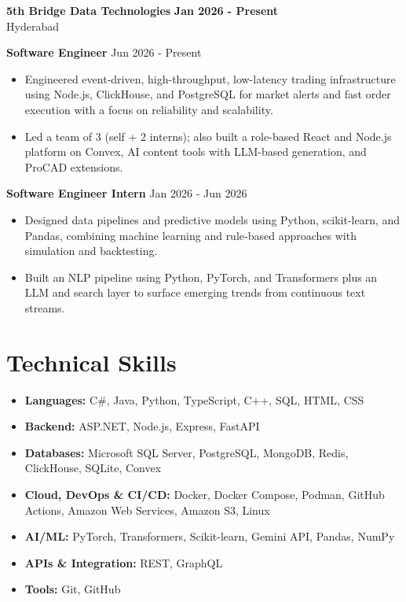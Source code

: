 \documentclass[a4paper,11pt]{article}
\newcommand{\resumeItem}[1]{\item \small{#1}}
\newcommand{\resumeSubheading}[4]{%
  \textbf{#1} \hfill \textbf{#2} \\
{#3} \hfill {#4}
}
\newcommand{\resumeSubHeadingListStart}{\begin{itemize}}
\newcommand{\resumeSubHeadingListEnd}{\end{itemize}}
\begin{document}
\resumeSubheading
{5th Bridge Data Technologies}{Jan 2026 - Present}
{Hyderabad}{}

\textbf{Software Engineer} \hfill {Jun 2026 - Present}
\resumeSubHeadingListStart
\resumeItem{Engineered event-driven, high-throughput, low-latency trading infrastructure using Node.js, ClickHouse, and PostgreSQL for market alerts and fast order execution with a focus on reliability and scalability.}
\resumeItem{Led a team of 3 (self + 2 interns); also built a role-based React and Node.js platform on Convex, AI content tools with LLM-based generation, and ProCAD extensions.}
\resumeSubHeadingListEnd

\textbf{Software Engineer Intern} \hfill {Jan 2026 - Jun 2026}
\resumeSubHeadingListStart
\resumeItem{Designed data pipelines and predictive models using Python, scikit-learn, and Pandas, combining machine learning and rule-based approaches with simulation and backtesting.}
\resumeItem{Built an NLP pipeline using Python, PyTorch, and Transformers plus an LLM and search layer to surface emerging trends from continuous text streams.}
\resumeSubHeadingListEnd


\section*{Technical Skills}
\begin{itemize}
\item \textbf{Languages:} C\#, Java, Python, TypeScript, C++, SQL, HTML, CSS
\item \textbf{Backend:} ASP.NET, Node.js, Express, FastAPI
\item \textbf{Databases:} Microsoft SQL Server, PostgreSQL, MongoDB, Redis, ClickHouse, SQLite, Convex
\item \textbf{Cloud, DevOps \& CI/CD:} Docker, Docker Compose, Podman, GitHub Actions, Amazon Web Services, Amazon S3, Linux
\item \textbf{AI/ML:} PyTorch, Transformers, Scikit-learn, Gemini API, Pandas, NumPy
\item \textbf{APIs \& Integration:} REST, GraphQL
\item \textbf{Tools:} Git, GitHub
\end{itemize}


\end{document}

